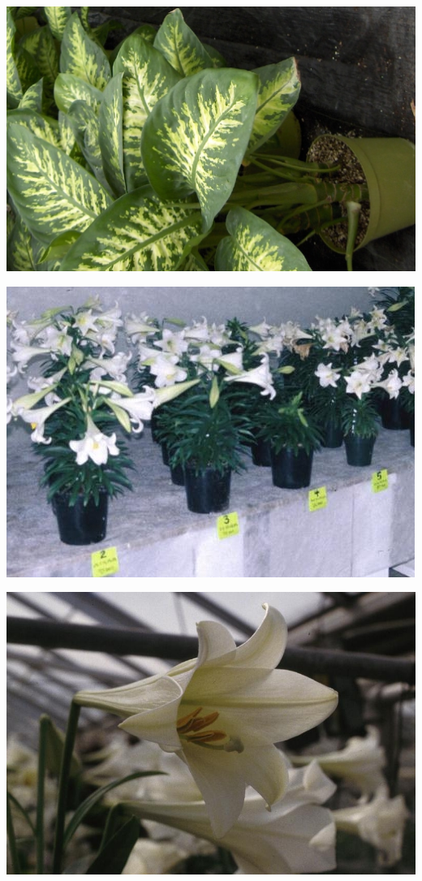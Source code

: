 \documentclass{article}
\begin{document}
\begin{center}
\includegraphics[height=0.925\paperheight]{../Dieffenbachia1.jpg}
\end{center}
\newpage

\begin{center}
\includegraphics[height=0.925\paperheight]{../EasterLily.jpg}
\end{center}
\newpage

\begin{center}
\includegraphics[height=0.925\paperheight]{../EasterLily_trumpet.jpg}
\end{center}
\newpage
\end{document}
